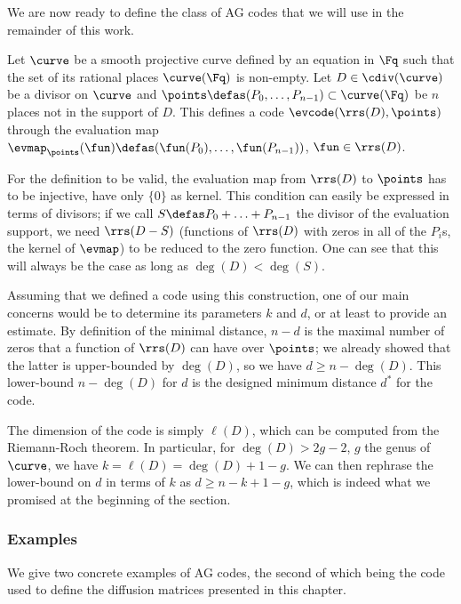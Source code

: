 We are now ready to define the class of AG codes that we will use in the remainder of this work.

Let $\curve$ be a smooth projective curve defined by an equation in $\Fq$ such that the set of its rational places $\curve(\Fq)$ is non-empty.
Let $D \in \cdiv(\curve)$ be a divisor on $\curve$ and $\points \defas (P_0, \ldots, P_{n-1}) \subset \curve(\Fq)$ be $n$ places not in the support of $D$.
This defines a code $\evcode(\rrs(D), \points)$ through the evaluation map $\evmap_\points(\fun) \defas (\fun(P_0),\ldots,\fun(P_{n-1}))$, $\fun \in \rrs(D)$.

For the definition to be valid, the evaluation map from $\rrs(D)$ to $\points$ has to be injective, \ie have only $\{0\}$ as kernel.
This condition can easily be expressed in terms of divisors; if we call $S \defas P_0 + \ldots + P_{n-1}$ the divisor of the
evaluation support, we need $\rrs(D - S)$ (\ie functions of $\rrs(D)$ with zeros in all of the $P_i$s, \ie the kernel of $\evmap$) to be reduced to the zero function.
One can see that this will always be the case as long as $\deg(D) < \deg(S)$.

\medskip

Assuming that we defined a code using this construction, one of our main concerns would be to determine its parameters $k$ and $d$, or at least to provide an estimate.
By definition of the minimal distance, $n - d$ is the maximal number of zeros that a function of $\rrs(D)$ can have
over $\points$; we already showed that the latter is upper-bounded by $\deg(D)$, so we have $d \geq n - \deg(D)$. This lower-bound
$n - \deg(D)$ for $d$ is the designed minimum distance $d^*$ for the code.

The dimension of the code is simply $\ell(D)$, which can be computed from the Riemann-Roch theorem. In particular, for $\deg(D) > 2g -2$, $g$ the genus of
$\curve$, we have $k = \ell(D) = \deg(D) + 1 - g$. We can then rephrase the lower-bound on $d$ in terms of $k$ as $d \geq n - k + 1 - g$, which is indeed
what we promised at the beginning of the section.

\subsubsection{Examples}

We give two concrete examples of AG codes, the second of which being the code used to define the diffusion matrices presented in this chapter.

